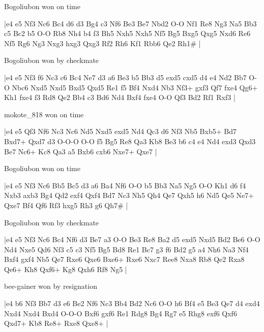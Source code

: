\showboard

Bogoliubon won on time

\makegametitle
|e4 e5 Nf3 Nc6 Bc4 d6 d3 Bg4 c3 Nf6 Be3 Be7 Nbd2 O-O Nf1 Re8 Ng3 Na5 Bb3 c5 Bc2 b5 O-O Rb8 Nh4 b4 f3 Bh5 Nxh5 Nxh5 Nf5 Bg5 Bxg5 Qxg5 Nxd6 Re6 Nf5 Rg6 Ng3 Nxg3 hxg3 Qxg3 Rf2 Rh6 Kf1 Rbb6 Qe2 Rh1\#  |

\showboard

Bogoliubon won by checkmate

\makegametitle
|e4 e5 Nf3 f6 Nc3 c6 Bc4 Ne7 d3 a6 Be3 b5 Bb3 d5 exd5 cxd5 d4 e4 Nd2 Bb7 O-O Nbc6 Nxd5 Nxd5 Bxd5 Qxd5 Re1 f5 Bf4 Nxd4 Nb3 Nf3+ gxf3 Qf7 fxe4 Qg6+ Kh1 fxe4 f3 Rd8 Qe2 Bb4 c3 Bd6 Nd4 Bxf4 fxe4 O-O Qf3 Bd2 Rf1 Rxf3  |

\showboard

mokote\_818 won on time

\makegametitle
|e4 e5 Qf3 Nf6 Nc3 Nc6 Nd5 Nxd5 exd5 Nd4 Qc3 d6 Nf3 Nb5 Bxb5+ Bd7 Bxd7+ Qxd7 d3 O-O-O O-O f5 Bg5 Re8 Qa3 Kb8 Be3 b6 c4 e4 Nd4 exd3 Qxd3 Be7 Nc6+ Kc8 Qa3 a5 Bxb6 cxb6 Nxe7+ Qxe7  |

\showboard

Bogoliubon won on time

\makegametitle
|e4 e5 Nf3 Nc6 Bb5 Bc5 d3 a6 Ba4 Nf6 O-O b5 Bb3 Na5 Ng5 O-O Kh1 d6 f4 Nxb3 axb3 Bg4 Qd2 exf4 Qxf4 Bd7 Nc3 Nh5 Qh4 Qe7 Qxh5 h6 Nd5 Qe5 Ne7+ Qxe7 Bf4 Qf6 Rf3 hxg5 Rh3 g6 Qh7\#  |

\showboard

Bogoliubon won by checkmate

\makegametitle
|e4 e5 Nf3 Nc6 Bc4 Nf6 d3 Be7 a3 O-O Be3 Re8 Ba2 d5 exd5 Nxd5 Bd2 Be6 O-O Nd4 Nxe5 Qd6 Nf3 c5 c3 Nf5 Bg5 Bd8 Re1 Bc7 g3 f6 Bd2 g5 a4 Nh6 Na3 Nf4 Bxf4 gxf4 Nb5 Qe7 Rxe6 Qxe6 Bxe6+ Rxe6 Nxc7 Ree8 Nxa8 Rb8 Qe2 Rxa8 Qe6+ Kh8 Qxf6+ Kg8 Qxh6 Rf8 Ng5  |

\showboard

bee-gainer won by resignation

\makegametitle
|e4 b6 Nf3 Bb7 d3 e6 Be2 Nf6 Nc3 Bb4 Bd2 Nc6 O-O h6 Bf4 e5 Be3 Qe7 d4 exd4 Nxd4 Nxd4 Bxd4 O-O-O Bxf6 gxf6 Re1 Rdg8 Bg4 Rg7 e5 Rhg8 exf6 Qxf6 Qxd7+ Kb8 Re8+ Rxe8 Qxe8+  |

